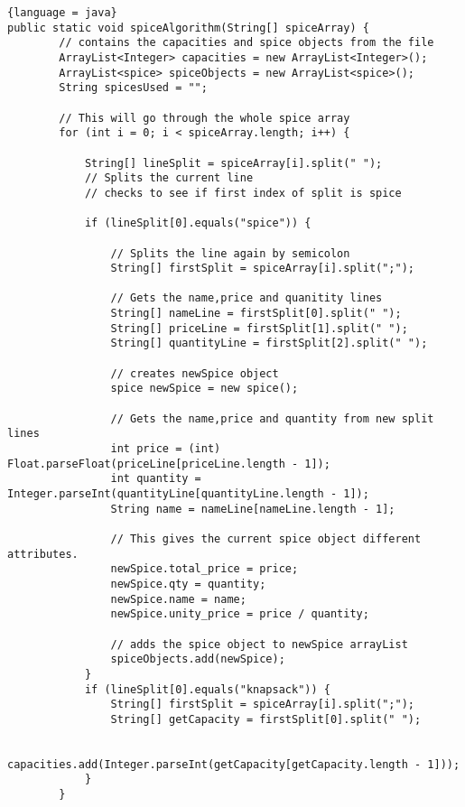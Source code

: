 \documentclass{article}
\begin{document}
\begin{lstlisting}{language = java}
public static void spiceAlgorithm(String[] spiceArray) {
        // contains the capacities and spice objects from the file
        ArrayList<Integer> capacities = new ArrayList<Integer>();
        ArrayList<spice> spiceObjects = new ArrayList<spice>();
        String spicesUsed = "";

        // This will go through the whole spice array
        for (int i = 0; i < spiceArray.length; i++) {
        
            String[] lineSplit = spiceArray[i].split(" ");
            // Splits the current line
            // checks to see if first index of split is spice
            
            if (lineSplit[0].equals("spice")) {
            
                // Splits the line again by semicolon
                String[] firstSplit = spiceArray[i].split(";");
                
                // Gets the name,price and quanitity lines
                String[] nameLine = firstSplit[0].split(" ");
                String[] priceLine = firstSplit[1].split(" ");
                String[] quantityLine = firstSplit[2].split(" ");
                
                // creates newSpice object
                spice newSpice = new spice();

                // Gets the name,price and quantity from new split lines
                int price = (int) Float.parseFloat(priceLine[priceLine.length - 1]);
                int quantity = Integer.parseInt(quantityLine[quantityLine.length - 1]);
                String name = nameLine[nameLine.length - 1];

                // This gives the current spice object different attributes.
                newSpice.total_price = price;
                newSpice.qty = quantity;
                newSpice.name = name;
                newSpice.unity_price = price / quantity;

                // adds the spice object to newSpice arrayList
                spiceObjects.add(newSpice);
            }
            if (lineSplit[0].equals("knapsack")) {
                String[] firstSplit = spiceArray[i].split(";");
                String[] getCapacity = firstSplit[0].split(" ");

                capacities.add(Integer.parseInt(getCapacity[getCapacity.length - 1]));
            }
        }


\end{lstlisting}
\end{document}
